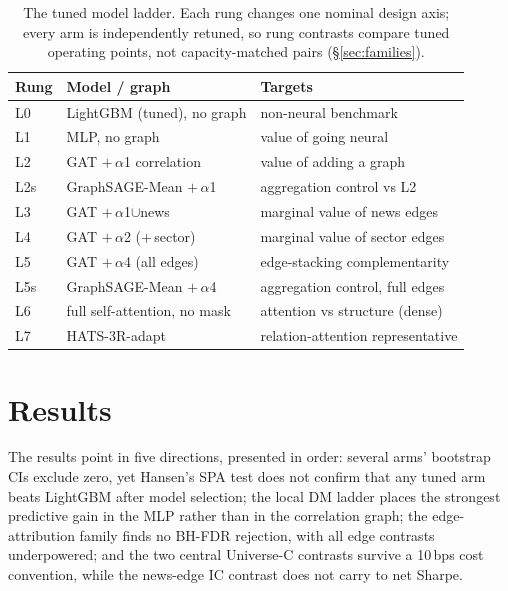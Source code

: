 \documentclass[sigconf,nonacm]{acmart}
\newcommand{\compacttable}{\scriptsize\setlength{\tabcolsep}{3pt}\renewcommand{\arraystretch}{0.88}}
\begin{document}
\begin{table}[t]
  \centering
  \caption{The tuned model ladder. Each rung changes one nominal design axis; every arm is independently retuned, so rung contrasts compare tuned operating points, not capacity-matched pairs (\S\ref{sec:families}).}
  \label{tab:ladder}
  \compacttable
  \begin{tabular}{@{}lll@{}}
    \toprule
    Rung & Model / graph & Targets \\
    \midrule
    L0  & LightGBM (tuned), no graph     & non-neural benchmark \\
    L1  & MLP, no graph                  & value of going neural \\
    L2  & GAT $+\,\alpha$1 correlation   & value of adding a graph \\
    L2s & GraphSAGE-Mean $+\,\alpha$1    & aggregation control vs L2 \\
    L3  & GAT $+\,\alpha$1$\cup$news     & marginal value of news edges \\
    L4  & GAT $+\,\alpha$2 (+\,sector)   & marginal value of sector edges \\
    L5  & GAT $+\,\alpha$4 (all edges)   & edge-stacking complementarity \\
    L5s & GraphSAGE-Mean $+\,\alpha$4    & aggregation control, full edges \\
    L6  & full self-attention, no mask   & attention vs structure (dense) \\
    L7  & HATS-3R-adapt                  & relation-attention representative \\
    \bottomrule
  \end{tabular}
\end{table}

\section{Results}\label{sec:results}

The results point in five directions, presented in order: several arms' bootstrap CIs exclude zero, yet Hansen's SPA test does not confirm that any tuned arm beats LightGBM after model selection; the local DM ladder places the strongest predictive gain in the MLP rather than in the correlation graph; the edge-attribution family finds no BH-FDR rejection, with all edge contrasts underpowered; and the two central Universe-C contrasts survive a 10\,bps cost convention, while the news-edge IC contrast does not carry to net Sharpe.
\end{document}
